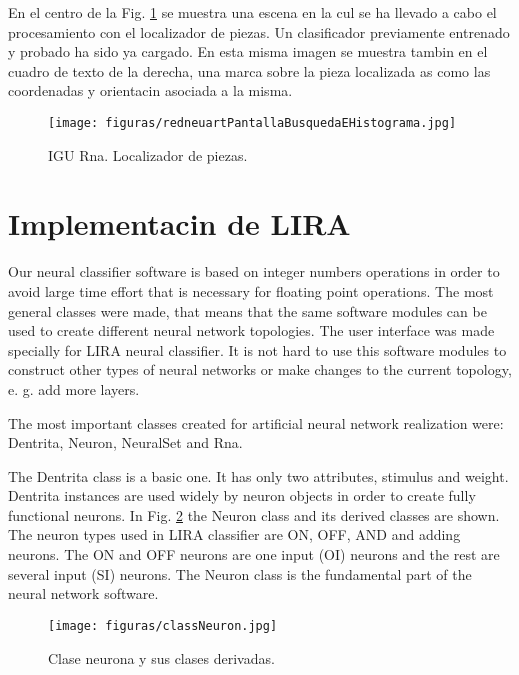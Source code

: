 En el centro de la Fig. \ref{redneuartpantallabusquedaehistograma} se muestra una escena en la cul se ha llevado a cabo el procesamiento con el localizador de piezas. Un clasificador previamente entrenado y probado ha sido ya cargado. En esta misma imagen se muestra tambin en el cuadro de texto de la derecha, una marca sobre la pieza localizada as como las coordenadas y orientacin asociada a la misma.

\begin{figure}[h]
\begin{center} \texttt{[image: figuras/redneuartPantallaBusquedaEHistograma.jpg]}\end{center}
\caption{IGU Rna. Localizador de piezas.}
\label{redneuartpantallabusquedaehistograma}
\end{figure}

\section{Implementacin de LIRA}
Our neural classifier software is based on integer numbers operations in order
to avoid large time effort that is necessary for floating point operations.
The most general classes were made, that means that the same software modules
can be used to create different neural network topologies. The user
interface was made specially for LIRA neural classifier. It
is not hard to use this software modules to construct other types
of neural networks or make changes to the current topology, e. g.
add more layers. 

The most important classes created for artificial neural network realization
were: Dentrita, Neuron, NeuralSet and Rna.

The Dentrita class is a basic one. It has only two attributes, stimulus
and weight. Dentrita instances are used widely by neuron objects in
order to create fully functional neurons. In Fig. \ref{classneuron}
the Neuron class and its derived classes are shown. The neuron types used in LIRA classifier
are ON, OFF, AND and adding neurons. The ON and OFF neurons are one
input (OI) neurons and the rest are several input (SI) neurons. The
Neuron class is the fundamental part of the neural network software.

\begin{figure}[h]
\begin{center} \texttt{[image: figuras/classNeuron.jpg]}\end{center}
\caption{Clase neurona y sus clases derivadas.}
\label{classneuron}
\end{figure}

